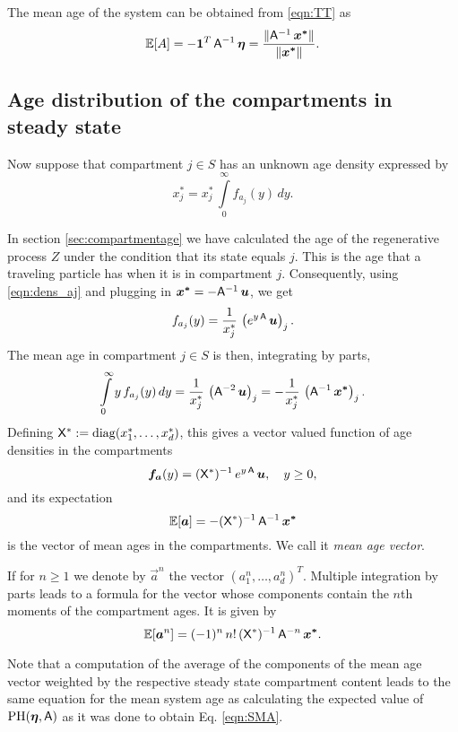 \documentclass[smallextended]{svjour3}
\newcommand{\E}{\mathbb{E}}
\newcommand{\intl}{\int\limits}
\begin{document}
The mean age of the system can be obtained from \eqref{eqn:TT} as
\begin{equation}\label{eqn:SMA}
    \E[A]=-\vec{1}^T\,\tens{A}^{-1}\,\vec{\eta} = \frac{\|\tens{A}^{-1}\,\vec{x^\ast}\|}{\|\vec{x^\ast}\|}.
\end{equation}

\subsection{Age distribution of the compartments in steady state}

Now suppose that compartment $j\in S$ has an unknown age density expressed by
\[
    x_j^\ast = x_j^\ast\,\intl_0^\infty f_{a_j}(y)\,dy.
\]

In section \ref{sec:compartmentage} we have calculated the age of the regenerative process $Z$ under the condition that its state equals $j$.
This is the age that a traveling particle has when it is in compartment $j$.
Consequently, using \eqref{eqn:dens_aj} and plugging in $\vec{x^\ast}=-\tens{A}^{-1}\,\vec{u}$, we get
\[
    f_{a_j}(y) = \frac{1}{x^\ast_j}\,\left(e^{y\,\tens{A}}\,\vec{u}\right)_j.
\]
The mean age in compartment $j\in S$ is then, integrating by parts,
\[
    \intl_0^\infty y\,f_{a_j}(y)\,dy = \frac{1}{x^\ast_j}\,\left(\tens{A}^{-2}\,\vec{u}\right)_j = -\frac{1}{x^\ast_j}\,\left(\tens{A}^{-1}\,\vec{x^\ast}\right)_j.
\]
Defining $\mathsf{X^\ast}:=\operatorname{diag}(x^\ast_1,\ldots,x^\ast_d)$, this gives a vector valued function of age densities in the compartments
\[
    \vec{f_a}(y) = (\tens{X^\ast})^{-1}\,e^{y\,\tens{A}}\,\vec{u},\quad y\geq0,
\]
and its expectation
\begin{equation}\label{eqn:MAv}
    \E[\vec{a}] = -(\tens{X^\ast})^{-1}\, \tens{A}^{-1}\,\vec{x^\ast}
\end{equation}
is the vector of mean ages in the compartments.
We call it \emph{mean age vector}.

If for $n\geq1$ we denote by $\vec{a}^n$ the vector $(a_1^n,\ldots,a_d^n)^T$.
Multiple integration by parts leads to a formula for the vector whose components contain the $n$th moments of the compartment ages.
It is given by
\[
    \E[\vec{a}^n] = (-1)^n\,n!\,(\tens{X^\ast})^{-1}\, \tens{A}^{-n}\,\vec{x^\ast}.
\]

Note that a computation of the average of the components of the mean age vector weighted by the respective steady state compartment content leads to the same equation for the mean system age as calculating the expected value of $\operatorname{PH}(\vec{\eta}, \tens{A})$ as it was done to obtain Eq. \eqref{eqn:SMA}.
\end{document}
